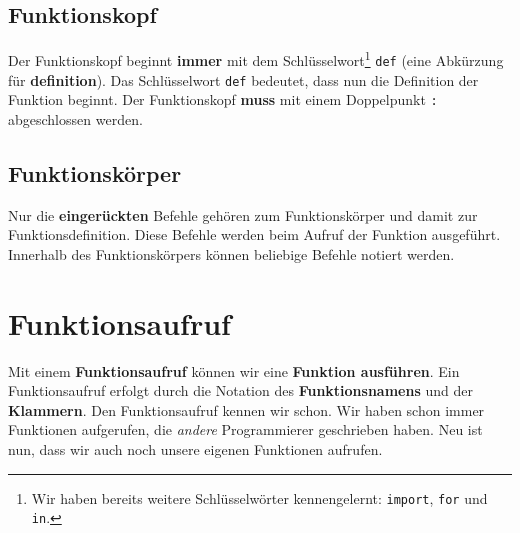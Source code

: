 \vspace{-0.75cm}

\subsection{Funktionskopf}

Der Funktionskopf beginnt \textbf{immer} mit dem Schlüsselwort\footnote{Wir haben bereits weitere Schlüsselwörter kennengelernt: \lstinline[language={python3}]{import}, \lstinline[language={python3}]{for} und \lstinline[language={python3}]{in}.} \lstinline[language={python3}]{def} (eine Abkürzung für \textbf{definition}). Das Schlüsselwort \lstinline[language={python3}]{def} bedeutet, dass nun die Definition der Funktion beginnt. Der Funktionskopf \textbf{muss} mit einem Doppelpunkt \lstinline[language={python3}]{:} abgeschlossen werden.

\subsection{Funktionskörper}

Nur die \textbf{eingerückten} Befehle gehören zum Funktionskörper und damit zur Funktionsdefinition. Diese Befehle werden beim Aufruf der Funktion ausgeführt. Innerhalb des Funktionskörpers können beliebige Befehle notiert werden.


\vspace{-0.65cm}


\section{Funktionsaufruf}

Mit einem \textbf{Funktionsaufruf} können wir eine \textbf{Funktion ausführen}. Ein Funktionsaufruf erfolgt durch die Notation des \textbf{Funktionsnamens} und der \textbf{Klammern}. Den Funktionsaufruf kennen wir schon. Wir haben schon immer Funktionen aufgerufen, die \textit{andere} Programmierer geschrieben haben. Neu ist nun, dass wir auch noch unsere eigenen Funktionen aufrufen.

